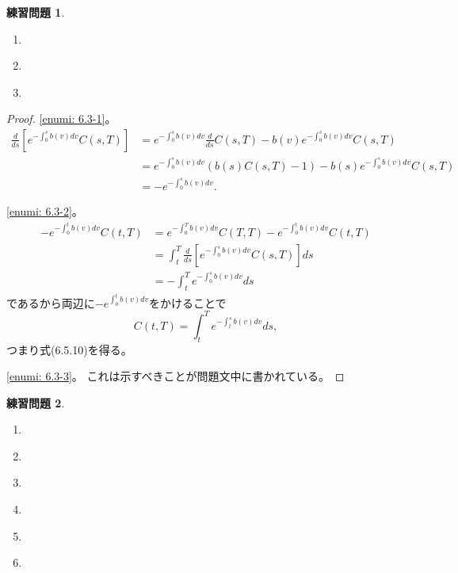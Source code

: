 \documentclass[uplatex]{jsarticle}
\theoremstyle{definition}
\newtheorem{prob}[prob]{練習問題}
\begin{document}
\begin{prob}\label{prob: 6.3}
  \begin{enumerate}
    \item \label{enumi: 6.3-1}
    \item \label{enumi: 6.3-2}
    \item \label{enumi: 6.3-3}
  \end{enumerate}
\end{prob}

\begin{proof}
  \ref{enumi: 6.3-1}。
  \begin{align*}
    \frac{d}{ds}\left[ e^{-\int_0^sb(v)dv}C(s,T) \right]
    &= e^{-\int_0^sb(v)dv}\frac{d}{ds}C(s,T)
    - b(v)e^{-\int_0^sb(v)dv}C(s,T) \\
    &= e^{-\int_0^sb(v)dv}\left( b(s)C(s,T) - 1\right)
    - b(s)e^{-\int_0^sb(v)dv}C(s,T) \\
    &= -e^{-\int_0^sb(v)dv}.
  \end{align*}

  \ref{enumi: 6.3-2}。
  \begin{align*}
    - e^{-\int_0^tb(v)dv}C(t,T)
    &= e^{-\int_0^Tb(v)dv}C(T,T) - e^{-\int_0^tb(v)dv}C(t,T) \\
    &= \int_t^T \frac{d}{ds}\left[ e^{-\int_0^sb(v)dv}C(s,T) \right] ds \\
    &= - \int_t^T e^{-\int_0^sb(v)dv} ds
  \end{align*}
  であるから両辺に\(-e^{\int_0^tb(v)dv}\)をかけることで
  \[
  C(t,T) = \int_t^T e^{-\int_t^sb(v)dv} ds,
  \]
  つまり式(6.5.10)を得る。

  \ref{enumi: 6.3-3}。
  これは示すべきことが問題文中に書かれている。
\end{proof}


\begin{prob}\label{prob: 6.4}
  \begin{enumerate}
    \item \label{enumi: 6.4-1}
    \item \label{enumi: 6.4-2}
    \item \label{enumi: 6.4-3}
    \item \label{enumi: 6.4-4}
    \item \label{enumi: 6.4-5}
    \item \label{enumi: 6.4-6}
  \end{enumerate}
\end{prob}
\end{document}
